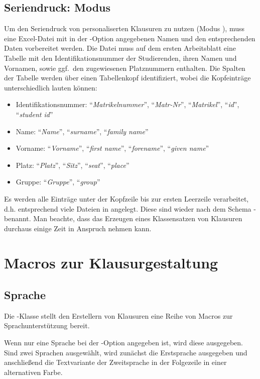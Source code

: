 \documentclass[
load=osgexam,
babel=ngerman
]{skdoc}
\begin{document}
\subsection{Seriendruck: Modus }
\label{sec:series} 
Um den Seriendruck von personaliserten Klausuren zu nutzen (Modus ), muss eine Excel-Datei mit in der
-Option angegebenen Namen und den entsprechenden Daten vorbereitet werden.
 Die Datei muss auf dem ersten Arbeitsblatt eine Tabelle mit den Identifikationsnummer der
Studierenden, ihren Namen und Vornamen, sowie ggf.\ den zugewiesenen Platznummern enthalten. Die Spalten der Tabelle
werden über einen Tabellenkopf identifiziert, wobei die Kopfeinträge unterschiedlich lauten können:
\begin{itemize}[nosep]
  \item Identifikationsnummer: ``\emph{Matrikelnummer}'', ``\emph{Matr-Nr}'', ``\emph{Matrikel}'', ``\emph{id}'', ``\emph{student id}''
  \item Name: ``\emph{Name}'', ``\emph{surname}'', ``\emph{family name}''
  \item Vorname: ``\emph{Vorname}'', ``\emph{first name}'', ``\emph{forename}'', ``\emph{given name}''
  \item Platz: ``\emph{Platz}'', ``\emph{Sitz}'', ``\emph{seat}'', ``\emph{place}''
  \item Gruppe: ``\emph{Gruppe}'', ``\emph{group}''
\end{itemize}
Es werden alle Einträge unter der Kopfzeile bis zur ersten Leerzeile verarbeitet, d.\;h. entsprechend viele Dateien in
 angelegt. Diese sind wieder nach dem Schema - benannt.
Man beachte, dass das Erzeugen eines Klassensatzen von Klausuren durchaus einige Zeit in Anspruch nehmen kann.

\section{Macros zur Klausurgestaltung}
\subsection{Sprache}
\label{sec:macro:lang}
Die \thepkg-Klasse stellt den Erstellern von Klausuren eine Reihe von Macros zur Sprachunterstützung bereit.

\DescribeMacro{} Wenn nur eine Sprache bei der
-Option angegeben ist, wird diese ausgegeben. Sind zwei Sprachen ausgewählt, wird zunächst die Erstsprache
ausgegeben und anschließend die Textvariante der Zweitsprache in der Folgezeile in einer alternativen Farbe.
\medskip
\end{document}

